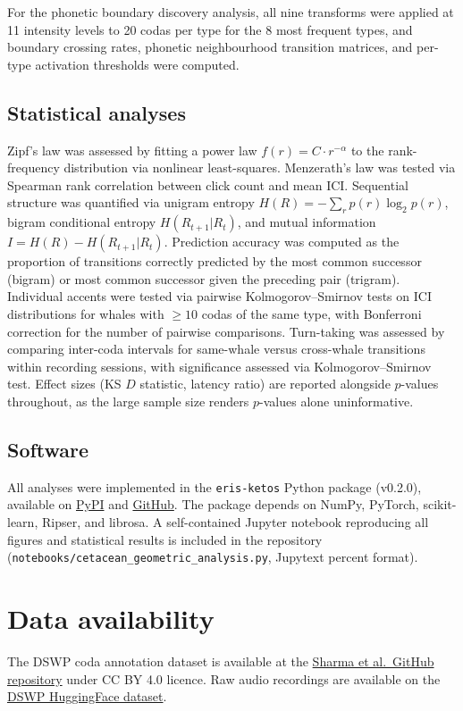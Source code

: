 \documentclass[11pt,a4paper]{article}
\begin{document}
For the phonetic boundary discovery analysis, all nine transforms were
applied at 11 intensity levels to 20 codas per type for the 8 most
frequent types, and boundary crossing rates, phonetic neighbourhood
transition matrices, and per-type activation thresholds were computed.

\subsection{Statistical analyses}
Zipf's law was assessed by fitting a power law $f(r) = C \cdot
r^{-\alpha}$ to the rank-frequency distribution via nonlinear
least-squares. Menzerath's law was tested via Spearman rank correlation
between click count and mean ICI. Sequential structure was quantified
via unigram entropy $H(R) = -\sum_r p(r) \log_2 p(r)$, bigram
conditional entropy $H(R_{t+1} | R_t)$, and mutual information
$I = H(R) - H(R_{t+1} | R_t)$. Prediction accuracy was computed as the
proportion of transitions correctly predicted by the most common
successor (bigram) or most common successor given the preceding pair
(trigram). Individual accents were tested via pairwise Kolmogorov--Smirnov
tests on ICI distributions for whales with $\geq 10$ codas of the same
type, with Bonferroni correction for the number of pairwise comparisons.
Turn-taking was assessed by comparing inter-coda intervals for
same-whale versus cross-whale transitions within recording sessions,
with significance assessed via Kolmogorov--Smirnov test. Effect sizes
(KS $D$ statistic, latency ratio) are reported alongside $p$-values
throughout, as the large sample size renders $p$-values alone
uninformative.

\subsection{Software}
All analyses were implemented in the \texttt{eris-ketos} Python package
(v0.2.0), available on
\href{https://pypi.org/project/eris-ketos/0.2.0/}{PyPI} and
\href{https://github.com/ahb-sjsu/eris-ketos}{GitHub}. The package
depends on NumPy, PyTorch, scikit-learn, Ripser, and librosa. A
self-contained Jupyter notebook reproducing all figures and statistical
results is included in the repository
(\texttt{notebooks/cetacean\_geometric\_analysis.py}, Jupytext percent
format).

\section*{Data availability}
The DSWP coda annotation dataset is available at the
\href{https://github.com/pratyushasharma/sw-combinatoriality}{Sharma et al.\ GitHub repository}
under CC BY 4.0 licence. Raw audio recordings are available on the
\href{https://huggingface.co/datasets/orrp/DSWP}{DSWP HuggingFace dataset}.
\end{document}
